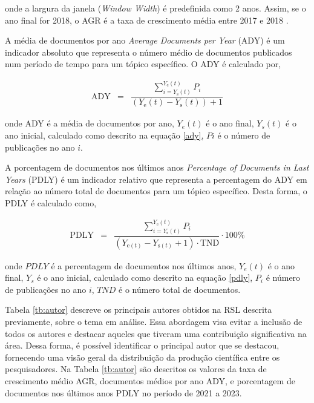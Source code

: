 \noindent onde a largura da janela (\textit{Window Width}) é predefinida como 2 anos. Assim, se o ano final for 2018, o AGR é a taxa de crescimento média entre 2017 e 2018 \cite{scientopy}.

A média de documentos por ano  \textit{Average Documents per Year} (ADY) é um indicador absoluto que representa o número médio de documentos publicados num período de tempo para um tópico específico. O ADY é calculado por,

\begin{eqnarray}
	\mathrm{ADY}&=&\dfrac{\sum_{i={Y_{\mathrm{s}}}(t)}^{Y_{\mathrm{e}}(t)} P_i}{\left(Y_{\mathrm{e}}(t)-Y_{\mathrm{s}}(t)\right)+1}\label{ady}
\end{eqnarray}

\noindent onde ADY é a média de documentos por ano, $Y_e(t)$ é o ano final, $Y_s(t)$ é o ano inicial, calculado como descrito na equação \eqref{ady}, $Pi$ é o número de publicações no ano $i$.

A porcentagem de documentos nos últimos anos  \textit{Percentage of Documents in Last Years} (PDLY) é um indicador relativo que representa a percentagem do ADY em relação ao número total de documentos para um tópico específico. Desta forma, o PDLY é calculado como,

\begin{eqnarray}
	\mathrm{PDLY}&=&\dfrac{\sum_{i={Y_{\mathrm{s}}(t)}}^{Y_{\mathrm{e}}(t)} P_i}{\left(Y_{\mathrm{e}(t)}-Y_{\mathrm{s}(t)}+1\right) \cdot \mathrm{TND}} \cdot 100 \%\label{pdly}
\end{eqnarray}

\noindent onde $PDLY$ é a percentagem de documentos nos últimos anos, $Y_e(t)$ é o ano final, $Y_s$ é o ano inicial, calculado como descrito na equação \eqref{pdly}, $P_i$ é número de publicações no ano $i$, $TND$ é o número total de documentos.

Tabela \ref{tb:autor} descreve os principais autores obtidos na RSL descrita previamente, sobre o tema em análise. Essa abordagem visa evitar a inclusão de todos os autores e destacar aqueles que tiveram uma contribuição significativa na área. Dessa forma, é possível identificar o principal autor que se destacou, fornecendo uma visão geral da distribuição da produção científica entre os pesquisadores. Na Tabela \ref{tb:autor} são descritos os valores da taxa de crescimento médio AGR, documentos médios por ano ADY, e porcentagem de documentos nos últimos anos PDLY no período de 2021 a 2023.


